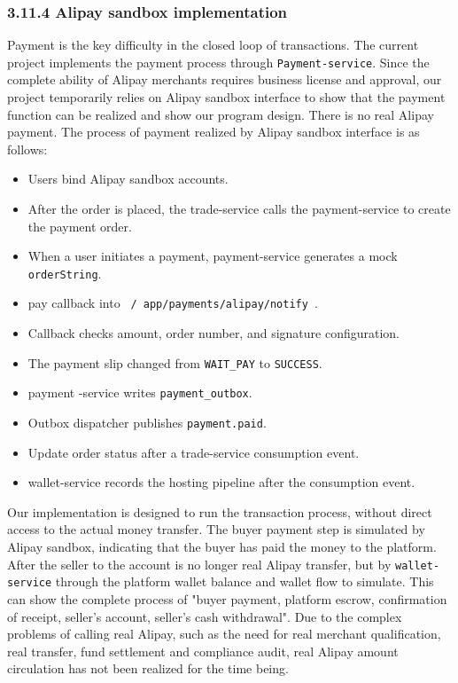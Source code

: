 \documentclass{article}
\begin{document}
\subsubsection{3.11.4 Alipay sandbox implementation}

Payment is the key difficulty in the closed loop of transactions. The current project implements the payment process through \texttt{Payment-service}. Since the complete ability of Alipay merchants requires business license and approval, our project temporarily relies on Alipay sandbox interface to show that the payment function can be realized and show our program design. There is no real Alipay payment. The process of payment realized by Alipay sandbox interface is as follows:

\begin{itemize}
    \item Users bind Alipay sandbox accounts.
    \item After the order is placed, the trade-service calls the payment-service to create the payment order.
    \item When a user initiates a payment, payment-service generates a mock \texttt{orderString}.
    \item pay callback into \texttt{ / app/payments/alipay/notify }.
    \item Callback checks amount, order number, and signature configuration.
    \item The payment slip changed from \texttt{WAIT\_PAY} to \texttt{SUCCESS}.
    \item payment -service writes \texttt{payment\_outbox}.
    \item Outbox dispatcher publishes \texttt{payment.paid}.
    \item Update order status after a trade-service consumption event.
    \item wallet-service records the hosting pipeline after the consumption event.
\end{itemize}

Our implementation is designed to run the transaction process, without direct access to the actual money transfer. The buyer payment step is simulated by Alipay sandbox, indicating that the buyer has paid the money to the platform. After the seller to the account is no longer real Alipay transfer, but by \texttt{wallet-service} through the platform wallet balance and wallet flow to simulate. This can show the complete process of "buyer payment, platform escrow, confirmation of receipt, seller's account, seller's cash withdrawal". Due to the complex problems of calling real Alipay, such as the need for real merchant qualification, real transfer, fund settlement and compliance audit, real Alipay amount circulation has not been realized for the time being.
\end{document}
